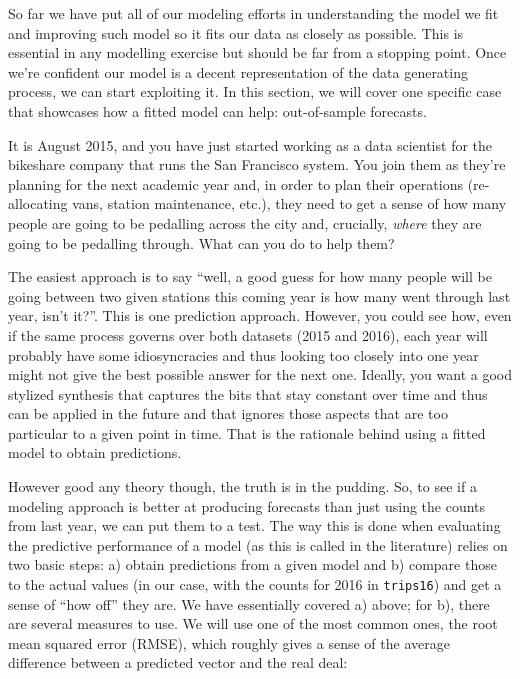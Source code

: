 \documentclass[
]{book}
\begin{document}
So far we have put all of our modeling efforts in understanding the model we fit and improving such model so it fits our data as closely as possible. This is essential in any modelling exercise but should be far from a stopping point. Once we're confident our model is a decent representation of the data generating process, we can start exploiting it. In this section, we will cover one specific case that showcases how a fitted model can help: out-of-sample forecasts.

It is August 2015, and you have just started working as a data scientist for the bikeshare company that runs the San Francisco system. You join them as they're planning for the next academic year and, in order to plan their operations (re-allocating vans, station maintenance, etc.), they need to get a sense of how many people are going to be pedalling across the city and, crucially, \emph{where} they are going to be pedalling through. What can you do to help them?

The easiest approach is to say ``well, a good guess for how many people will be going between two given stations this coming year is how many went through last year, isn't it?''. This is one prediction approach. However, you could see how, even if the same process governs over both datasets (2015 and 2016), each year will probably have some idiosyncracies and thus looking too closely into one year might not give the best possible answer for the next one. Ideally, you want a good stylized synthesis that captures the bits that stay constant over time and thus can be applied in the future and that ignores those aspects that are too particular to a given point in time. That is the rationale behind using a fitted model to obtain predictions.

However good any theory though, the truth is in the pudding. So, to see if a modeling approach is better at producing forecasts than just using the counts from last year, we can put them to a test. The way this is done when evaluating the predictive performance of a model (as this is called in the literature) relies on two basic steps: a) obtain predictions from a given model and b) compare those to the actual values (in our case, with the counts for 2016 in \texttt{trips16}) and get a sense of ``how off'' they are. We have essentially covered a) above; for b), there are several measures to use. We will use one of the most common ones, the root mean squared error (RMSE), which roughly gives a sense of the average difference between a predicted vector and the real deal:
\end{document}
